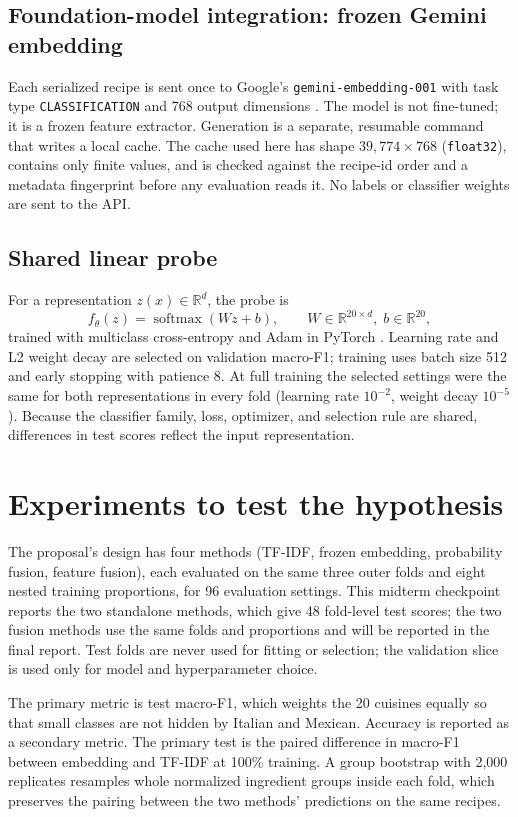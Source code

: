 \documentclass[11pt,letterpaper]{article}
\newcommand{\tfidf}{TF-IDF}
\newcommand{\macrof}{macro-F1}
\begin{document}
\subsection{Foundation-model integration: frozen Gemini embedding}
Each serialized recipe is sent once to Google's \texttt{gemini-embedding-001} with task type \texttt{CLASSIFICATION} and 768 output dimensions \cite{gemini}. The model is not fine-tuned; it is a frozen feature extractor. Generation is a separate, resumable command that writes a local cache. The cache used here has shape $39{,}774 \times 768$ (\texttt{float32}), contains only finite values, and is checked against the recipe-id order and a metadata fingerprint before any evaluation reads it. No labels or classifier weights are sent to the API.

\subsection{Shared linear probe}
For a representation $z(x)\in\mathbb{R}^d$, the probe is
\[
f_\theta(z)=\operatorname{softmax}(Wz+b), \qquad W\in\mathbb{R}^{20\times d},\; b\in\mathbb{R}^{20},
\]
trained with multiclass cross-entropy and Adam in PyTorch \cite{pytorch}. Learning rate and L2 weight decay are selected on validation \macrof{}; training uses batch size 512 and early stopping with patience 8. At full training the selected settings were the same for both representations in every fold (learning rate $10^{-2}$, weight decay $10^{-5}$). Because the classifier family, loss, optimizer, and selection rule are shared, differences in test scores reflect the input representation.

\section{Experiments to test the hypothesis}
The proposal's design has four methods (\tfidf{}, frozen embedding, probability fusion, feature fusion), each evaluated on the same three outer folds and eight nested training proportions, for 96 evaluation settings. This midterm checkpoint reports the two standalone methods, which give 48 fold-level test scores; the two fusion methods use the same folds and proportions and will be reported in the final report. Test folds are never used for fitting or selection; the validation slice is used only for model and hyperparameter choice.

The primary metric is test \macrof{}, which weights the 20 cuisines equally so that small classes are not hidden by Italian and Mexican. Accuracy is reported as a secondary metric. The primary test is the paired difference in \macrof{} between embedding and \tfidf{} at 100\% training. A group bootstrap with 2,000 replicates resamples whole normalized ingredient groups inside each fold, which preserves the pairing between the two methods' predictions on the same recipes.
\end{document}
